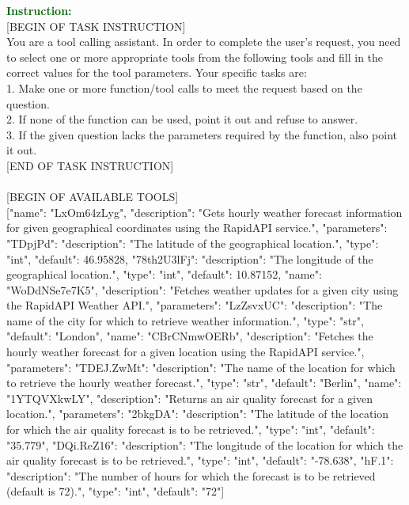 \begin{figure*}[!ht]
\begin{tcolorbox}[colback=gray!5!white,colframe=black!95!black,title=\textbf{\small{Hammer SFT Sample} | \textbf{Format:} Function Calling}] 
\small \textcolor{darkgreen}{\textbf{Instruction:}} \\
{[BEGIN OF TASK INSTRUCTION]} \\
You are a tool calling assistant. In order to complete the user's request, you need to select one or more appropriate tools from the following tools and fill in the correct values for the tool parameters. Your specific tasks are: \\
1. Make one or more function/tool calls to meet the request based on the question. \\
2. If none of the function can be used, point it out and refuse to answer. \\
3. If the given question lacks the parameters required by the function, also point it out. \\
{[END OF TASK INSTRUCTION]} \\
 \\
{[BEGIN OF AVAILABLE TOOLS]} \\
{[{"name": "LxOm64zLyg", "description": "Gets hourly weather forecast information for given geographical coordinates using the RapidAPI service.", "parameters": {"TDpjPd": {"description": "The latitude of the geographical location.", "type": "int", "default": 46.95828}, "78th2U3lFj": {"description": "The longitude of the geographical location.", "type": "int", "default": 10.87152}}}, {"name": "WoDdNSe7e7K5", "description": "Fetches weather updates for a given city using the RapidAPI Weather API.", "parameters": {"LzZsvxUC": {"description": "The name of the city for which to retrieve weather information.", "type": "str", "default": "London"}}}, {"name": "CBrCNmwOERb", "description": "Fetches the hourly weather forecast for a given location using the RapidAPI service.", "parameters": {"TDEJ.ZwMt": {"description": "The name of the location for which to retrieve the hourly weather forecast.", "type": "str", "default": "Berlin"}}}, {"name": "1YTQVXkwLY", "description": "Returns an air quality forecast for a given location.", "parameters": {"2bkgDA": {"description": "The latitude of the location for which the air quality forecast is to be retrieved.", "type": "int", "default": "35.779"}, "DQi.ReZ16": {"description": "The longitude of the location for which the air quality forecast is to be retrieved.", "type": "int", "default": "-78.638"}, "hF.1": {"description": "The number of hours for which the forecast is to be retrieved (default is 72).", "type": "int", "default": "72"}}}]} \\

\end{tcolorbox}
\end{figure*}
